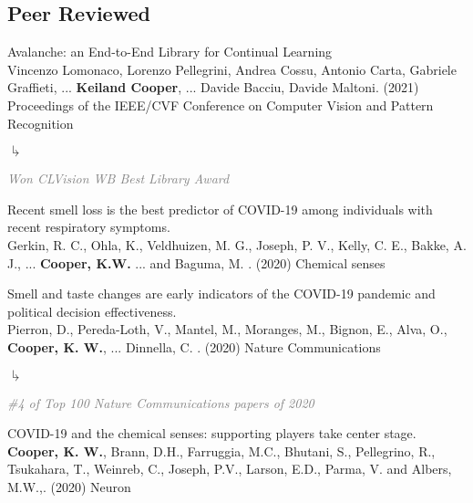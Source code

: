 \documentclass[10pt]{cooperCV2}
\begin{document}
\subsection{Peer Reviewed} 
% 
\begin{etaremune}[resume,itemindent=-1.5\bibhang, topsep=0pt,
				   itemsep=\bibsep,partopsep=0pt,parsep=0pt,leftmargin={\bibhang+\widthof{[999]}}] 
    
    \item Avalanche: an End-to-End Library for Continual Learning \\
     Vincenzo Lomonaco, Lorenzo Pellegrini, Andrea Cossu, Antonio Carta, Gabriele Graffieti, ... \textbf{Keiland Cooper}, ... Davide Bacciu, Davide Maltoni. (2021) Proceedings of the IEEE/CVF Conference on Computer Vision and Pattern Recognition 
     
     	\begin{list}{$\drsh$}{}
     	
	      \item \textcolor{grey}{\textit{Won CLVision WB Best Library Award} }
     	
     	\end{list} 
     
	
    \item Recent smell loss is the best predictor of COVID-19 among individuals with recent respiratory symptoms. \\
     Gerkin, R. C., Ohla, K., Veldhuizen, M. G., Joseph, P. V., Kelly, C. E., Bakke, A. J., ... \textbf{Cooper, K.W.} ... and Baguma, M. . (2020) Chemical senses 
     
	
    \item Smell and taste changes are early indicators of the COVID-19 pandemic and political decision effectiveness. \\
     Pierron, D., Pereda-Loth, V., Mantel, M., Moranges, M., Bignon, E., Alva, O.,  \textbf{Cooper, K. W.}, ... Dinnella, C. . (2020) Nature Communications 
     
     	\begin{list}{$\drsh$}{}
     	
	      \item \textcolor{grey}{\textit{\#4 of Top 100 Nature Communications papers of 2020} }
     	
     	\end{list} 
     
	
    \item COVID-19 and the chemical senses: supporting players take center stage. \\
     \textbf{Cooper, K. W.}, Brann, D.H., Farruggia, M.C., Bhutani, S., Pellegrino, R., Tsukahara, T., Weinreb, C., Joseph, P.V., Larson, E.D., Parma, V. and Albers, M.W.,. (2020) Neuron 
     

\end{etaremune}
\end{document}
